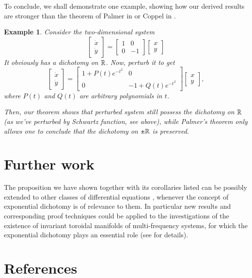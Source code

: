 \documentclass{elsarticle}
\newtheorem{example}{\indent Example}[section]
\theoremstyle{remark}
\begin{document}
To conclude, we shall demonstrate one example, showing how our derived results are stronger than the theorem of Palmer in
\cite{palmer1984exponential} or Coppel in \cite{coppel1978dichotomies}.
\begin{example}
	Consider the two-dimensional system
	\[\begin{bmatrix}\dot{x}\\\dot{y}\end{bmatrix}=
		\begin{bmatrix}1&0\\0&-1\end{bmatrix}
	\begin{bmatrix}{x}\\{y}\end{bmatrix}\]
	It obviously has a dichotomy on $\mathbb{R}$. Now, perturb it to get
	\[\begin{bmatrix}\dot{x}\\\dot{y}\end{bmatrix}=
		\begin{bmatrix}1+P(t)e^{-t^2}&0\\0&-1+Q(t)e^{-t^2}\end{bmatrix}
	\begin{bmatrix}{x}\\{y}\end{bmatrix},\]
	where $P(t)$ and $Q(t)$ are arbitrary polynomials in $t$.

	Then, our theorem shows that perturbed system still possess the dichotomy on $\mathbb{R}$ (as we've perturbed by Schwartz function, see above),
	while Palmer's theorem only allows one to conclude that the dichotomy on $\pm\mathbb{R}$ is preserved.
\end{example}
\section{Further work}
The proposition we have shown together with its corollaries listed can be possibly extended to other classes of differential equations
, whenever the concept of exponential dichotomy is of relevance to them. In particular new results and corresponding proof techniques
could be applied to the investigations of the existence of invariant toroidal manifolds of multi-frequency systems, for
 which the exponential dichotomy plays an essential role (see \cite{samoilenko2012elements,mitropolsky2002dichotomies} for details).
\section*{References}

\end{document}
